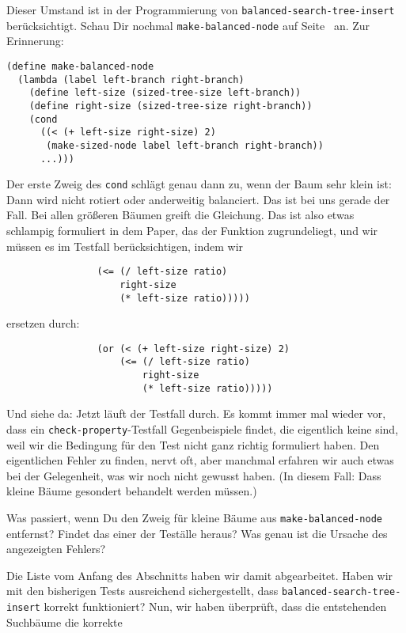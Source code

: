 Dieser Umstand ist in der Programmierung von
\lstinline{balanced-search-tree-insert} berücksichtigt.  Schau Dir
nochmal \lstinline{make-balanced-node} auf
Seite~\pageref{func:make-balanced-node} an.  Zur Erinnerung:
%
\begin{lstlisting}
(define make-balanced-node
  (lambda (label left-branch right-branch)
    (define left-size (sized-tree-size left-branch))
    (define right-size (sized-tree-size right-branch))
    (cond
      ((< (+ left-size right-size) 2)
       (make-sized-node label left-branch right-branch))
      ...)))
\end{lstlisting}
%
Der erste Zweig des \lstinline{cond} schlägt genau dann zu, wenn der
Baum sehr klein ist: Dann wird nicht rotiert oder anderweitig
balanciert.  Das ist bei uns gerade der Fall.  Bei allen größeren
Bäumen greift die Gleichung.  Das ist also etwas schlampig formuliert
in dem Paper, das der Funktion zugrundeliegt, und wir müssen es im
Testfall berücksichtigen, indem wir
%
\begin{lstlisting}
                (<= (/ left-size ratio)
                    right-size
                    (* left-size ratio)))))
\end{lstlisting}
%
ersetzen durch:
%
\begin{lstlisting}
                (or (< (+ left-size right-size) 2)
                    (<= (/ left-size ratio)
                        right-size
                        (* left-size ratio)))))
\end{lstlisting}
%
Und siehe da: Jetzt läuft der Testfall durch.
Es kommt immer mal wieder vor, dass ein
\lstinline{check-property}-Testfall Gegenbeispiele findet, die
eigentlich keine sind, weil wir die Bedingung für den Test nicht ganz
richtig formuliert haben.  Den eigentlichen Fehler zu finden, nervt
oft, aber manchmal erfahren wir auch etwas bei der Gelegenheit, was
wir noch nicht gewusst haben.  (In diesem Fall: Dass kleine Bäume
gesondert behandelt werden müssen.)
%
\begin{aufgabeinline}
  Was passiert, wenn Du den Zweig für kleine Bäume aus
  \lstinline{make-balanced-node} entfernst?  Findet das einer der
  Teställe heraus?  Was genau ist die Ursache des angezeigten Fehlers?
\end{aufgabeinline}
%
Die Liste vom Anfang des Abschnitts haben wir damit abgearbeitet.
Haben wir mit den bisherigen Tests ausreichend sichergestellt, dass
\lstinline{balanced-search-tree-insert} korrekt funktioniert?
Nun, wir haben überprüft, dass die entstehenden Suchbäume die korrekte
